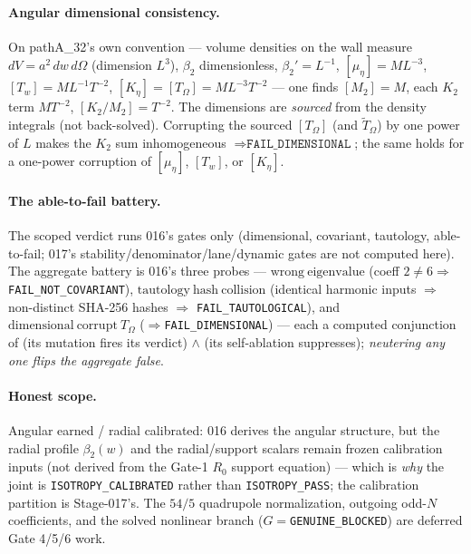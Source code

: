 \paragraph{Angular dimensional consistency.}
On pathA\_32's own convention --- volume densities on the wall measure
\(dV=a^2\,dw\,d\Omega\) (dimension \(L^3\)), \(\beta_2\) dimensionless, \(\beta_2'=L^{-1}\),
\([\mu_\eta]=M L^{-3}\), \([T_w]=M L^{-1}T^{-2}\), \([K_\eta]=[T_\Omega]=M L^{-3}T^{-2}\)
--- one finds \([M_2]=M\), each \(K_2\) term \(M T^{-2}\), \([K_2/M_2]=T^{-2}\). The
dimensions are \emph{sourced} from the density integrals (not back-solved). Corrupting the
sourced \([T_\Omega]\) (and \(\tilde T_\Omega\)) by one power of \(L\) makes the \(K_2\)
sum inhomogeneous \(\Rightarrow\texttt{FAIL\_DIMENSIONAL}\); the same holds for a one-power
corruption of \([\mu_\eta]\), \([T_w]\), or \([K_\eta]\).

\paragraph{The able-to-fail battery.}
The scoped verdict runs 016's gates only (dimensional, covariant, tautology, able-to-fail;
017's stability/denominator/lane/dynamic gates are not computed here). The aggregate battery
is 016's three probes --- \(\mathrm{wrong\ eigenvalue}\) (coeff \(2\ne6\Rightarrow\)
\texttt{FAIL\_NOT\_COVARIANT}), \(\mathrm{tautology\ hash\ collision}\) (identical harmonic
inputs \(\Rightarrow\) non-distinct SHA-256 hashes \(\Rightarrow\) \texttt{FAIL\_TAUTOLOGICAL}),
and \(\mathrm{dimensional\ corrupt\ }T_\Omega\) (\(\Rightarrow\)\texttt{FAIL\_DIMENSIONAL}) ---
each a computed conjunction of (its mutation fires its verdict) \(\wedge\) (its self-ablation
suppresses); \emph{neutering any one flips the aggregate false}.

\paragraph{Honest scope.}
Angular earned / radial calibrated: 016 derives the angular structure, but the radial profile
\(\beta_2(w)\) and the radial/support scalars remain frozen calibration inputs (not derived
from the Gate-1 \(R_0\) support equation) --- which is \emph{why} the joint is
\texttt{ISOTROPY\_CALIBRATED} rather than \texttt{ISOTROPY\_PASS}; the calibration partition
is Stage-017's. The \(54/5\) quadrupole normalization, outgoing odd-\(N\) coefficients, and
the solved nonlinear branch (\(G=\)\texttt{GENUINE\_BLOCKED}) are deferred Gate 4/5/6 work.

